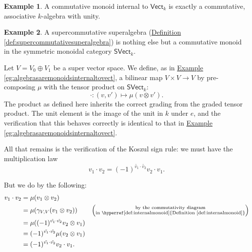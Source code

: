 \documentclass[a4paper,10pt]{scrreprt}
\theoremstyle{definition}
\newtheorem{example}{Example}[section]
\theoremstyle{plain}
\theoremstyle{remark}
\begin{document}
\begin{example}
  A commutative monoid internal to $\mathsf{Vect}_{k}$ is exactly a commutative, associative $k$-algebra with unity.
\end{example}

\begin{example}
  A supercommutative superalgebra (\hyperref[def:supercommutativesuperalgebra]{Definition \ref*{def:supercommutativesuperalgebra}}) is nothing else but a commutative monoid in the symmetric monoidal category $\mathsf{SVect}_{k}$.

  Let $V = V_{0} \oplus V_{1}$ be a super vector space. We define, as in \hyperref[eg:algebrasaremonoidsinternaltovect]{Example \ref*{eg:algebrasaremonoidsinternaltovect}}, a bilinear map $V \times V \to V$ by pre-composing $\mu$ with the tensor product on $\mathsf{SVect}_{k}$:
  \begin{equation*}
    \cdot\colon (v, v') \mapsto \mu(v \otimes v').
  \end{equation*}
  The product as defined here inherits the correct grading from the graded tensor product. The unit element is the image of the unit in $k$ under $e$, and the verification that this behaves correctly is identical to that in \hyperref[eg:algebrasaremonoidsinternaltovect]{Example \ref*{eg:algebrasaremonoidsinternaltovect}}.

  All that remains is the verification of the Koszul sign rule: we must have the multiplication law
  \begin{equation*}
    v_{1} \cdot v_{2} = (-1)^{\tilde{v_{1}} \cdot \tilde{v_{2}}} v_{2} \cdot v_{1}.
  \end{equation*}

  But we do by the following:
  \begin{align*}
    v_{1} \cdot v_{2} &= \mu(v_{1} \otimes v_{2}) \\
    &= \mu(\gamma_{V, V}(v_{1} \otimes v_{2})) &\left( \substack{\text{by the commutativity diagram}\\ \text{in \hyperref[def:internalmonoid]{Definition \ref*{def:internalmonoid}}}} \right)\\ 
    &= \mu((-1)^{\tilde{v_{1}} \cdot \tilde{v_{2}}} v_{2} \otimes v_{1}) \\
    &= (-1)^{\tilde{v_{1}} \cdot \tilde{v_{2}}} \mu(v_{2} \otimes v_{1}) \\
    &= (-1)^{\tilde{v_{1}} \cdot \tilde{v_{2}}} v_{2} \cdot v_{1}.
  \end{align*}
\end{example} 
\end{document}

